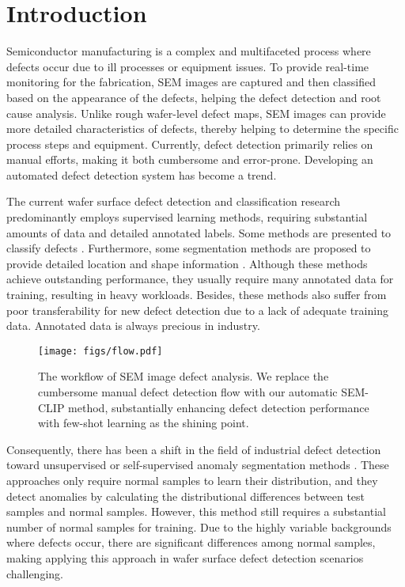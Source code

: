
\section{Introduction}
\label{sec:introduction}

Semiconductor manufacturing is a complex and multifaceted process where defects occur due to ill processes or equipment issues. To provide real-time monitoring for the fabrication, SEM images are captured and then classified based on the appearance of the defects, helping the defect detection and root cause analysis. 
Unlike rough wafer-level defect maps, SEM images can provide more detailed characteristics of defects, thereby helping to determine the specific process steps and equipment. Currently, defect detection primarily relies on manual efforts, making it both cumbersome and error-prone. Developing an automated defect detection system has become a trend.

The current wafer surface defect detection and classification research predominantly employs supervised learning methods, requiring substantial amounts of data and detailed annotated labels. Some methods are presented to classify defects \cite{chen2008defect, chang2013hybrid, cheon2019convolutional}. Furthermore, some segmentation methods are proposed to provide detailed location and shape information \cite{ronneberger2015u, badrinarayanan2017segnet, nag2022wafersegclassnet}. Although these methods achieve outstanding performance, they usually require many annotated data for training, resulting in heavy workloads. Besides, these methods also suffer from poor transferability for new defect detection due to a lack of adequate training data. Annotated data is always precious in industry.

\begin{figure}[tb!]
  \centering
  \texttt{[image: figs/flow.pdf]}
  \caption{The workflow of SEM image defect analysis. We replace the cumbersome manual defect detection flow with our automatic SEM-CLIP method, substantially enhancing defect detection performance with few-shot learning as the shining point. 
}
  \label{fig:workflow}
\end{figure}

Consequently, there has been a shift in the field of industrial defect detection toward unsupervised or self-supervised anomaly segmentation methods \cite{zavrtanik2021draem, jiang2022masked, jiang2022softpatch, wang2023multimodal}. These approaches only require normal samples to learn their distribution, and they detect anomalies by calculating the distributional differences between test samples and normal samples. However, this method still requires a substantial number of normal samples for training. Due to the highly variable backgrounds where defects occur, there are significant differences among normal samples, making applying this approach in wafer surface defect detection scenarios challenging.

